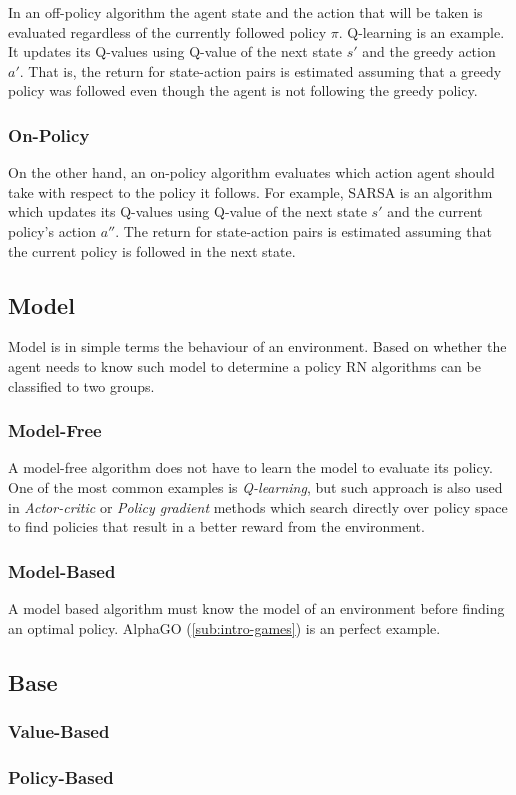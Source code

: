 In an off-policy algorithm the agent state and the action that will be taken is evaluated regardless of the currently followed policy $\pi$. Q-learning is an example. It updates its Q-values using Q-value of the next state $s'$ and the greedy action $a'$. That is, the return for state-action pairs is estimated assuming that a greedy policy was followed even though the agent is not following the greedy policy.

\subsubsection*{On-Policy}
\label{sub2:on-policy}

On the other hand, an on-policy algorithm evaluates which action agent should take with respect to the policy it follows. For example, SARSA is an algorithm which updates its Q-values using Q-value of the next state $s'$ and the current policy's action $a''$. The return for state-action pairs is estimated assuming that the current policy is followed in the next state.

\subsection{Model}
\label{sub:model}

Model is in simple terms the behaviour of an environment. Based on whether the agent needs to know such model to determine a policy RN algorithms can be classified to two groups.

\subsubsection*{Model-Free}
\label{sub2:model-free}

A model-free algorithm does not have to learn the model to evaluate its policy. One of the most common examples is \emph{Q-learning}, but such approach is also used in \emph{Actor-critic} or \emph{Policy gradient} methods which search directly over policy space to find policies that result in a better reward from the environment.

\subsubsection*{Model-Based}
\label{sub2:model-based}

A model based algorithm must know the model of an environment before finding an optimal policy. \mbox{AlphaGO} (\ref{sub:intro-games}) is an perfect example.

\subsection{Base}

\subsubsection*{Value-Based}

\subsubsection*{Policy-Based}

